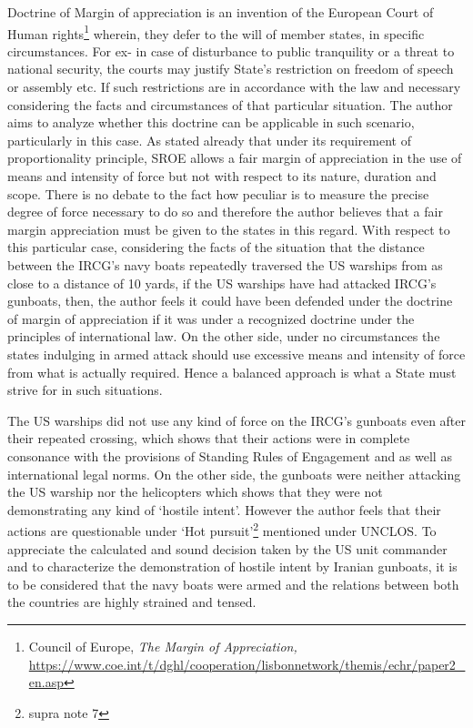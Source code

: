 \begin{multicols}{2}


\noi
Doctrine of Margin of appreciation is an invention of the European Court of Human
rights\footnote{Council of Europe, \textit{The Margin of Appreciation,}
 \url{https://www.coe.int/t/dghl/cooperation/lisbonnetwork/themis/echr/paper2_en.asp}} wherein, they defer to the will of member states, in specific circumstances. For ex- in
case of disturbance to public tranquility or a threat to national security, the courts may
justify State’s restriction on freedom of speech or assembly etc. If such restrictions are in
accordance with the law and necessary considering the facts and circumstances of that
particular situation. The author aims to analyze whether this doctrine can be applicable in
such scenario, particularly in this case. As stated already that under its requirement of
proportionality principle, SROE allows a fair margin of appreciation in the use of means and
intensity of force but not with respect to its nature, duration and scope. There is no debate to the fact how peculiar is to measure the precise degree of force necessary to do so and
therefore the author believes that a fair margin appreciation must be given to the states in
this regard. With respect to this particular case, considering the facts of the situation that the
distance between the IRCG’s navy boats repeatedly traversed the US warships from as close
to a distance of 10 yards, if the US warships have had attacked IRCG’s gunboats, then, the
author feels it could have been defended under the doctrine of margin of appreciation if it
was under a recognized doctrine under the principles of international law. On the other side,
under no circumstances the states indulging in armed attack should use excessive means
and intensity of force from what is actually required. Hence a balanced approach is what a
State must strive for in such situations.



\noi
The US warships did not use any kind of force on the IRCG’s gunboats even after their
repeated crossing, which shows that their actions were in complete consonance with the
provisions of Standing Rules of Engagement and as well as international legal norms. On
the other side, the gunboats were neither attacking the US warship nor the helicopters which
shows that they were not demonstrating any kind of ‘hostile intent’. However the author
feels that their actions are questionable under ‘Hot pursuit’\footnote{supra note 7} mentioned under UNCLOS. To
appreciate the calculated and sound decision taken by the US unit commander and to
characterize the demonstration of hostile intent by Iranian gunboats, it is to be considered
that the navy boats were armed and the relations between both the countries are highly
strained and tensed. 


\end{multicols}
